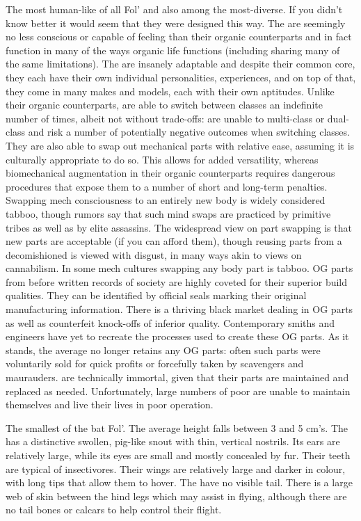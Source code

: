 \documentclass[twoside, 12pt, letterpaper]{report}\usepackage[]{graphicx}\usepackage[]{color}
\begin{document}
\begin{multicols*}{2}
\nsubsection{\mech}
The most human-like of all Fol' and also among the most-diverse. If you didn't know better it would seem that they were designed this way. The \mech are seemingly no less conscious or capable of feeling than their organic counterparts and in fact function in many of the ways organic life functions (including sharing many of the same limitations). The \mech are insanely adaptable and despite their common core, they each have their own individual personalities, experiences, and on top of that, they come in many makes and models, each with their own aptitudes. Unlike their organic counterparts, \mech are able to switch between classes an indefinite number of times, albeit not without trade-offs: \mech are unable to multi-class or dual-class and risk a number of potentially negative outcomes when switching classes. They are also able to swap out mechanical parts with relative ease, assuming it is culturally appropriate to do so. This allows for added versatility, whereas biomechanical augmentation in their organic counterparts requires dangerous procedures that expose them to a number of short and long-term penalties. Swapping mech consciousness to an entirely new body is widely considered tabboo, though rumors say that such mind swaps are practiced by primitive \mech tribes as well as by elite assassins. The widespread view on part swapping is that new parts are acceptable (if you can afford them), though reusing parts from a decomishioned \mech is viewed with disgust, in many ways akin to views on cannabilism. In some mech cultures swapping any body part is tabboo. OG parts from before written records of \mech society are highly coveted for their superior build qualities. They can be identified by official seals marking their original manufacturing information. There is a thriving black market dealing in OG parts as well as counterfeit knock-offs of inferior quality. Contemporary smiths and engineers have yet to recreate the processes used to create these OG parts. As it stands, the average \mech no longer retains any OG parts: often such parts were voluntarily sold for quick profits or forcefully taken by scavengers and maurauders. \mech are technically immortal, given that their parts are maintained and replaced as needed. Unfortunately, large numbers of poor \mech are unable to maintain themselves and live their lives in poor operation.


\nsubsection{\hnbat}
The smallest of the bat Fol'. The \hnbat average height falls between 3 and 5 cm's. The \hnbat has a distinctive swollen, pig-like snout with thin, vertical nostrils. Its ears are relatively large, while its eyes are small and mostly concealed by fur. Their teeth are typical of insectivores. Their wings are relatively large and darker in colour, with long tips that allow them to hover. The \hnbat have no visible tail. There is a large web of skin between the hind legs which may assist in flying, although there are no tail bones or calcars to help control their flight.


\end{multicols*}
\end{document}
